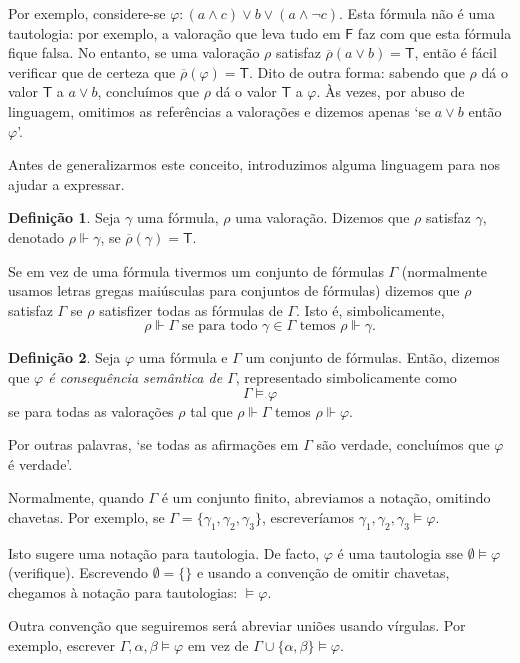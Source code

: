 \documentclass{report}
\theoremstyle{definition}
\newtheorem*{definicao*}{Definição}
\theoremstyle{remark}
\newcommand{\lt}{\mathsf{T}}
\newcommand{\lf}{\mathsf{F}}
\begin{document}
	Por exemplo, considere-se $\varphi : (a \land c) \lor b \lor (a \land \neg c)$. Esta fórmula não é uma tautologia: por exemplo, a valoração que leva tudo em $\lf$ faz com que esta fórmula fique falsa. No entanto, se uma valoração $\rho$ satisfaz $\overline\rho(a \lor b) = \lt$, então é fácil verificar que de certeza que $\overline\rho(\varphi) = \lt$. Dito de outra forma: sabendo que $\rho$ dá o valor $\lt$ a $a \lor b$, concluímos que $\rho$ dá o valor $\lt$ a $\varphi$. Às vezes, por abuso de linguagem, omitimos as referências a valorações e dizemos apenas `se $a \lor b$ então $\varphi$'.
	
	Antes de generalizarmos este conceito, introduzimos alguma linguagem para nos ajudar a expressar.
	
	\begin{definicao*}
	Seja $\gamma$ uma fórmula, $\rho$ uma valoração. Dizemos que $\rho$ satisfaz $\gamma$, denotado $\rho \Vdash \gamma$, se $\overline\rho(\gamma) = \lt$.
	
	Se em vez de uma fórmula tivermos um conjunto de fórmulas $\Gamma$ (normalmente usamos letras gregas maiúsculas para conjuntos de fórmulas) dizemos que $\rho$ satisfaz $\Gamma$ se $\rho$ satisfizer todas as fórmulas de $\Gamma$. Isto é, simbolicamente,
	\[\rho \Vdash \Gamma \text{ se para todo $\gamma \in \Gamma$ temos } \rho \Vdash \gamma.\]
	\end{definicao*}
	
	\begin{definicao*}
	Seja $\varphi$ uma fórmula e $\Gamma$ um conjunto de fórmulas. Então, dizemos que \emph{$\varphi$ é consequência semântica de $\Gamma$}, representado simbolicamente como
	\[\Gamma \vDash \varphi\]
	se para todas as valorações $\rho$ tal que $\rho \Vdash \Gamma$ temos $\rho \Vdash \varphi$.
	
	Por outras palavras, `se todas as afirmações em $\Gamma$ são verdade, concluímos que $\varphi$ é verdade'.
	
	Normalmente, quando $\Gamma$ é um conjunto finito, abreviamos a notação, omitindo chavetas. Por exemplo, se $\Gamma = \{\gamma_1, \gamma_2, \gamma_3\}$, escreveríamos $\gamma_1, \gamma_2, \gamma_3 \vDash \varphi$.\label{convencao:consequencia}
	
	Isto sugere uma notação para tautologia. De facto, $\varphi$ é uma tautologia sse $\emptyset \vDash \varphi$ (verifique). Escrevendo $\emptyset = \{\}$ e usando a convenção de omitir chavetas, chegamos à notação para tautologias: $\vDash \varphi$.
	
	Outra convenção que seguiremos será abreviar uniões usando vírgulas. Por exemplo, escrever $\Gamma, \alpha, \beta \vDash \varphi$ em vez de $\Gamma \cup \{\alpha, \beta\} \vDash \varphi$.
	\end{definicao*}
	
\end{document}

